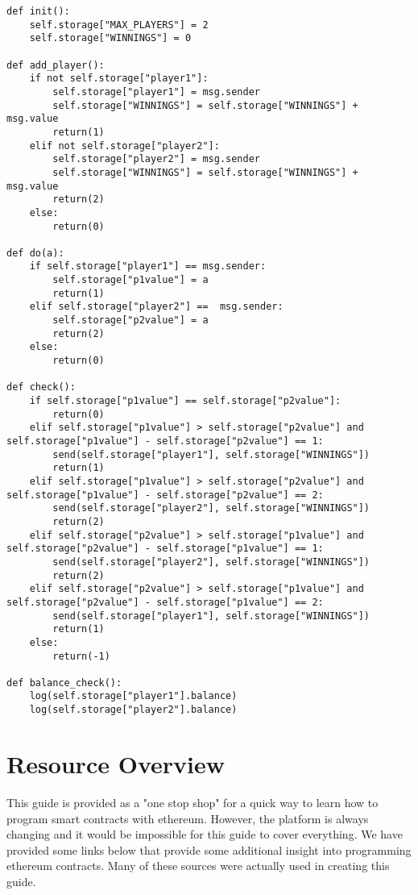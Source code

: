 \documentclass[12pt]{article}
\begin{document}
\begin{lstlisting}[frame=single]
def init():
	self.storage["MAX_PLAYERS"] = 2
	self.storage["WINNINGS"] = 0

def add_player():
	if not self.storage["player1"]:
		self.storage["player1"] = msg.sender
		self.storage["WINNINGS"] = self.storage["WINNINGS"] + msg.value
		return(1)
	elif not self.storage["player2"]:
		self.storage["player2"] = msg.sender
		self.storage["WINNINGS"] = self.storage["WINNINGS"] + msg.value
		return(2)
	else:
		return(0)

def do(a):
	if self.storage["player1"] == msg.sender:
		self.storage["p1value"] = a
		return(1)
	elif self.storage["player2"] ==  msg.sender:
		self.storage["p2value"] = a
		return(2)
	else:
		return(0)

def check():
	if self.storage["p1value"] == self.storage["p2value"]:
		return(0)
	elif self.storage["p1value"] > self.storage["p2value"] and self.storage["p1value"] - self.storage["p2value"] == 1:
		send(self.storage["player1"], self.storage["WINNINGS"]) 
		return(1)
	elif self.storage["p1value"] > self.storage["p2value"] and self.storage["p1value"] - self.storage["p2value"] == 2:
		send(self.storage["player2"], self.storage["WINNINGS"])
		return(2)
	elif self.storage["p2value"] > self.storage["p1value"] and self.storage["p2value"] - self.storage["p1value"] == 1:
		send(self.storage["player2"], self.storage["WINNINGS"])		
		return(2)
	elif self.storage["p2value"] > self.storage["p1value"] and self.storage["p2value"] - self.storage["p1value"] == 2:
		send(self.storage["player1"], self.storage["WINNINGS"])		
		return(1)
	else:
		return(-1)

def balance_check():
	log(self.storage["player1"].balance)
	log(self.storage["player2"].balance)
\end{lstlisting}



\section{Resource Overview}

This guide is provided as a "one stop shop" for a quick way to learn how to program smart contracts with ethereum. However, the platform is always changing and it would be impossible for this guide to cover everything. We have provided some links below that provide some additional insight into programming ethereum contracts. Many of these sources were actually used in creating this guide. 
\end{document}
